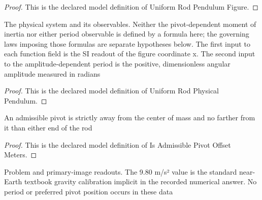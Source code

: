 \begin{proof}
  This is the declared model definition of Uniform Rod Pendulum Figure.
\end{proof}
\begin{definition}
  \label{def:physics:phyx-mini-0266:phyxminiproblems-problemphyxmini0266-uniformrodphysicalpendulum}
  The physical system and its observables. Neither the pivot-dependent moment of inertia nor either period observable is defined by a formula here; the governing laws imposing those formulas are separate hypotheses below. The first input to each function field is the SI readout of the figure coordinate x. The second input to the amplitude-dependent period is the positive, dimensionless angular amplitude measured in radians
\end{definition}
\begin{proof}
  This is the declared model definition of Uniform Rod Physical Pendulum.
\end{proof}
\begin{definition}
  \label{def:physics:phyx-mini-0266:phyxminiproblems-problemphyxmini0266-isadmissiblepivotoffsetmeters}
  An admissible pivot is strictly away from the center of mass and no farther from it than either end of the rod
\end{definition}
\begin{proof}
  This is the declared model definition of Is Admissible Pivot Offset Meters.
\end{proof}
\begin{definition}
  \label{def:physics:phyx-mini-0266:phyxminiproblems-problemphyxmini0266-matchesproblemandfiguredata}
  Problem and primary-image readouts. The 9.80 m/s² value is the standard near-Earth textbook gravity calibration implicit in the recorded numerical answer. No period or preferred pivot position occurs in these data
\end{definition}
